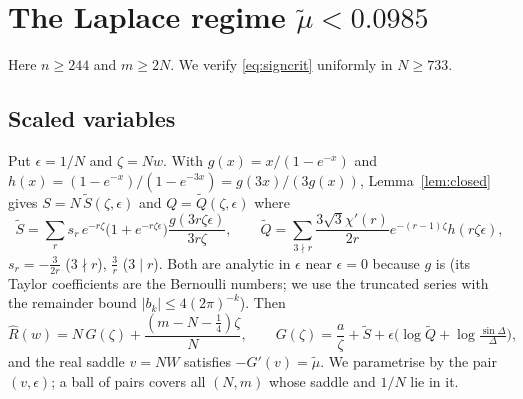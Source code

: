 \documentclass[11pt,reqno]{amsart}
\theoremstyle{plain}
\theoremstyle{definition}
\newcommand{\Rh}{\widehat{R}}
\begin{document}
\section{The Laplace regime $\tilde\mu<0.0985$}\label{sec:laplace}

Here $n\ge244$ and $m\ge2N$. We verify \eqref{eq:signcrit} uniformly in $N\ge733$.

\subsection{Scaled variables}
Put $\epsilon=1/N$ and $\zeta=Nw$. With $g(x)=x/(1-e^{-x})$ and $h(x)=(1-e^{-x})/(1-e^{-3x})=g(3x)/(3g(x))$, Lemma~\ref{lem:closed} gives
$S=N\,\widetilde S(\zeta,\epsilon)$ and $Q=\widetilde Q(\zeta,\epsilon)$ where
\[
\widetilde S=\sum_r s_r\,e^{-r\zeta}\bigl(1+e^{-r\zeta\epsilon}\bigr)\frac{g(3r\zeta\epsilon)}{3r\zeta},\qquad
\widetilde Q=\sum_{3\nmid r}\frac{3\sqrt3\chi'(r)}{2r}e^{-(r-1)\zeta}h(r\zeta\epsilon),
\]
$s_r=-\frac3{2r}$ ($3\nmid r$), $\frac3r$ ($3\mid r$). Both are analytic in $\epsilon$ near $\epsilon=0$ because $g$ is (its Taylor
coefficients are the Bernoulli numbers; we use the truncated series with the remainder bound $|b_k|\le4(2\pi)^{-k}$). Then
\[
\Rh(w)=N\,G(\zeta)+\frac{(m-N-\frac14)\zeta}{N},\qquad G(\zeta)=\frac a\zeta+\widetilde S+\epsilon\bigl(\log\widetilde Q+\log\tfrac{\sin\Delta}{\Delta}\bigr),
\]
and the real saddle $v=NW$ satisfies $-G'(v)=\tilde\mu$. We parametrise by the pair $(v,\epsilon)$; a ball of pairs covers all
$(N,m)$ whose saddle and $1/N$ lie in it.
\end{document}
